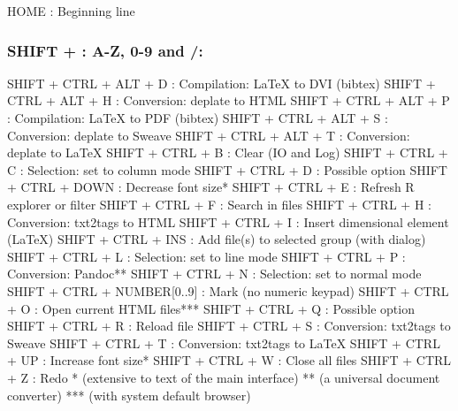 \vspace{-0.5cm}
\begin{Rtables}[caption={[HOME keyboard shortcut]
    HOME keyboard shortcut},
  label=shortcut:home]
  HOME    : Beginning line
\end{Rtables}


\newpage
\subsubsection{SHIFT + : A-Z, 0-9 and /:}

\begin{Rtables}[caption={[SHIFT + keyboard shortcuts]
    SHIFT + keyboard shortcuts},
  label=shortcut:shiftplus]
  SHIFT + CTRL + ALT + D      : Compilation: LaTeX to DVI (bibtex)
  SHIFT + CTRL + ALT + H      : Conversion: deplate to HTML
  SHIFT + CTRL + ALT + P      : Compilation: LaTeX to PDF (bibtex)
  SHIFT + CTRL + ALT + S      : Conversion: deplate to Sweave
  SHIFT + CTRL + ALT + T      : Conversion: deplate to LaTeX
  SHIFT + CTRL + B            : Clear (IO and Log)
  SHIFT + CTRL + C            : Selection: set to column mode
  SHIFT + CTRL + D            : Possible option
  SHIFT + CTRL + DOWN         : Decrease font size*
  SHIFT + CTRL + E            : Refresh R explorer or filter
  SHIFT + CTRL + F            : Search in files
  SHIFT + CTRL + H            : Conversion: txt2tags to HTML
  SHIFT + CTRL + I            : Insert dimensional element (LaTeX)
  SHIFT + CTRL + INS          : Add file(s) to selected group (with dialog)
  SHIFT + CTRL + L            : Selection: set to line mode
  SHIFT + CTRL + P            : Conversion: Pandoc**
  SHIFT + CTRL + N            : Selection: set to normal mode
  SHIFT + CTRL + NUMBER[0..9] : Mark (no numeric keypad)
  SHIFT + CTRL + O            : Open current HTML files***
  SHIFT + CTRL + Q            : Possible option
  SHIFT + CTRL + R            : Reload file
  SHIFT + CTRL + S            : Conversion: txt2tags to Sweave
  SHIFT + CTRL + T            : Conversion: txt2tags to LaTeX
  SHIFT + CTRL + UP           : Increase font size*
  SHIFT + CTRL + W            : Close all files
  SHIFT + CTRL + Z            : Redo
  *   (extensive to text of the main interface)
  **  (a universal document converter)
  *** (with system default browser)
\end{Rtables}

